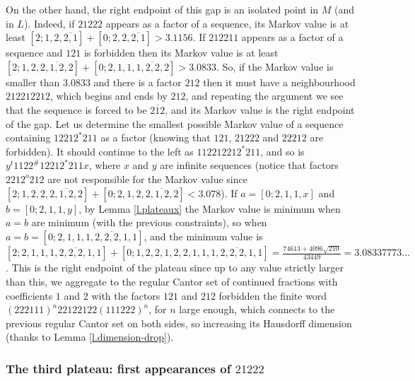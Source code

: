 \documentclass[10pt]{amsart}
\numberwithin{equation}{section}
\theoremstyle{definition}
\begin{document}
On the other hand, the right endpoint of this gap is an isolated point in $M$ (and in $L$). Indeed, if $21222$ appears as a factor of a sequence, its Markov value is at least $[2;1,2,\overline{2,1}]+[0;2,2,\overline{2,1}]>3.1156$. If $212211$ appears as a factor of a sequence and $121$ is forbidden then its Markov value is at least $[2;1,2,\overline{2,1,2,2}]+[0;2,1,1,\overline{1,2,2,2}]>3.0833$. So, if the Markov value is smaller than $3.0833$ and there is a factor $212$ then it must have a neighbourhood $212212212$, which begins and ends by $212$, and repeating the argument we see that the sequence is forced to be $\overline{212}$, and its Markov value is the right endpoint of the gap. Let us determine the smallest possible Markov value of a sequence containing $12212^*211$ as a factor (knowing that $121$, $21222$ and $22212$ are forbidden). It should continue to the left as $112212212^*211$, and so is $y^{t}1122^{\#}12212^*211x$, where $x$ and $y$ are infinite sequences (notice that factors $2212^{o}212$ are not responsible for the Markov value since $[2;1,2,2,\overline{2,1,2,2}]+[0;2,1,2,\overline{2,1,2,2}]<3.078$). If $a=[0;2,1,1,x]$ and $b=[0;2,1,1,y]$, by Lemma \ref{l.plateaux} the Markov value is minimum when $a=b$ are minimum (with the previous constraints), so when $a=b=[0;2,1,1,\overline{1,2,2,2,1,1}]$, and the minimum value is $[2;2,1,1,\overline{1,2,2,2,1,1}]+[0;1,2,2,1,2,2,1,1,\overline{1,2,2,2,1,1}]=\frac{74613+4096\sqrt{210}}{43449}=3.08337773...$. This is the right endpoint of the plateau since up to any value strictly larger than this, we aggregate to the regular Cantor set of continued fractions with coefficients $1$ and $2$ with the factors $121$ and $212$ forbidden the finite word $(222111)^n 22122122 (111222)^n$, for $n$ large enough, which connects to the previous regular Cantor set on both sides, so increasing its Hausdorff dimension (thanks to Lemma \ref{l.dimension-drop}). 

\subsubsection{The third plateau: first appearances of $21222$} 
\end{document}
